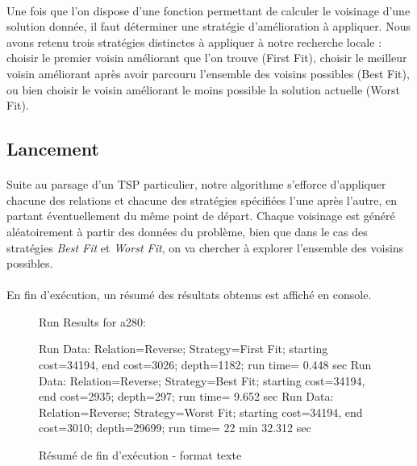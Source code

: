 \documentclass[a4paper,10pt]{report}
\begin{document}
\paragraph{}
  Une fois que l'on dispose d'une fonction permettant de calculer le voisinage
d'une solution donnée, il faut déterminer une stratégie d'amélioration à
appliquer. Nous avons retenu trois stratégies distinctes à appliquer à notre
recherche locale : choisir le premier voisin améliorant que l'on trouve (First
Fit), choisir le meilleur voisin améliorant après avoir parcouru l'ensemble des
voisins possibles (Best Fit), ou bien choisir le voisin améliorant le moins
possible la solution actuelle (Worst Fit).



\subsection{Lancement}

\paragraph{}
  Suite au parsage d'un TSP particulier, notre algorithme s'efforce d'appliquer
chacune des relations et chacune des stratégies spécifiées l'une après l'autre,
en partant éventuellement du même point de départ. Chaque voisinage est généré
aléatoirement à partir des données du problème, bien que dans le cas des
stratégies \textit{Best Fit} et \textit{Worst Fit}, on va chercher à explorer
l'ensemble des voisins possibles.

\paragraph{}
En fin d'exécution, un résumé des résultats obtenus est affiché en console.

\begin{figure}[h]
Run Results for a280:
 \begin{center}
Run Data: Relation=Reverse;	Strategy=First Fit;	starting cost=34194,
  end cost=3026;	depth=1182;	run time= 0.448 sec\linebreak
Run Data: Relation=Reverse;	Strategy=Best Fit;	starting cost=34194,
  end cost=2935;	depth=297;	run time= 9.652 sec\linebreak
Run Data: Relation=Reverse;	Strategy=Worst Fit;	starting cost=34194,
  end cost=3010;	depth=29699;	run time= 22 min 32.312 sec\linebreak
 \end{center}
  \label{a280-sample-results}
  \caption{Résumé de fin d'exécution - format texte}
\end{figure}
\end{document}
